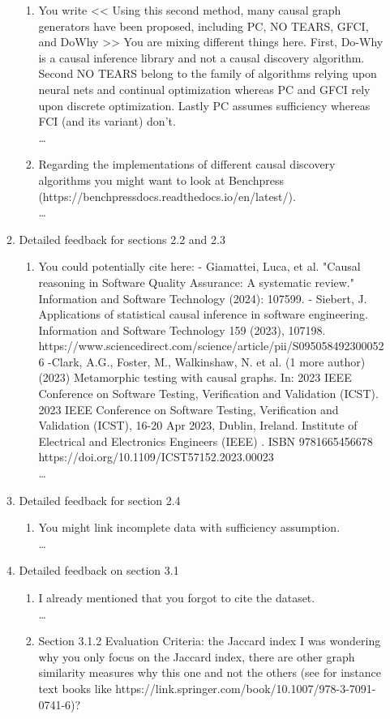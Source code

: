 \documentclass[]{svjour3}
\begin{document}
\begin{enumerate}
\begin{enumerate}
\begin{enumerate}
    \item You write << Using this second method, many causal graph generators have been proposed, including PC, NO TEARS, GFCI, and DoWhy >> You are mixing different things here. First, Do-Why is a causal inference library and not a causal discovery algorithm. Second NO TEARS belong to the family of algorithms relying upon neural nets and continual optimization whereas PC and GFCI rely upon discrete optimization. Lastly PC assumes sufficiency  whereas FCI (and its variant) don't.\\{\MARK \dots}

    \item Regarding the implementations of different causal discovery algorithms you might want to look at Benchpress (https://benchpressdocs.readthedocs.io/en/latest/).
    \\{\MARK \dots}
    
\end{enumerate}
\item Detailed feedback for sections 2.2 and 2.3
\begin{enumerate}
    \item You could potentially cite here:
- Giamattei, Luca, et al. "Causal reasoning in Software Quality Assurance: A systematic review." Information and Software Technology (2024): 107599.
- Siebert, J. Applications of statistical causal inference in software engineering. Information and Software Technology 159 (2023), 107198. https://www.sciencedirect.com/science/article/pii/S0950584923000526
-Clark, A.G., Foster, M., Walkinshaw, N. et al. (1 more author) (2023) Metamorphic testing with causal graphs. In: 2023 IEEE Conference on Software Testing, Verification and Validation (ICST). 2023 IEEE Conference on Software Testing, Verification and Validation (ICST), 16-20 Apr 2023, Dublin, Ireland. Institute of Electrical and Electronics Engineers (IEEE) . ISBN 9781665456678 https://doi.org/10.1109/ICST57152.2023.00023\\{\MARK \dots}
\end{enumerate}
\item Detailed feedback for section 2.4 
\begin{enumerate}
    \item You might link incomplete data with sufficiency assumption.\\{\MARK \dots}
\end{enumerate}
\item Detailed feedback on section 3.1 
\begin{enumerate}
    \item I already mentioned that you forgot to cite the dataset.\\{\MARK \dots}
    \item Section 3.1.2 Evaluation Criteria: the Jaccard index
I was wondering why you only focus on the Jaccard index, there are other graph similarity measures why this one and not the others (see for instance text books like https://link.springer.com/book/10.1007/978-3-7091-0741-6)?


\end{enumerate}
\end{enumerate}
\end{enumerate}
\end{document}
